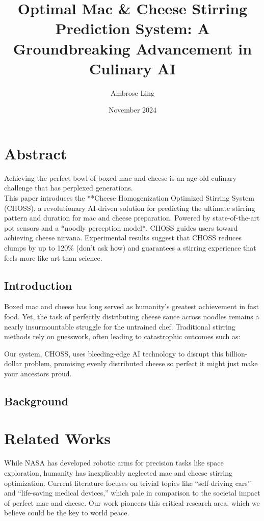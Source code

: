 \documentclass[twocolumn]{article}
\title{Optimal Mac \& Cheese Stirring Prediction System: A Groundbreaking Advancement in Culinary AI}
\author{Ambrose Ling}
\date{November 2024}
\begin{document}
\maketitle

\section{Abstract}
\indent Achieving the perfect bowl of boxed mac and cheese is an age-old culinary challenge that has perplexed generations. \\ \indent This paper introduces the **Cheese Homogenization Optimized Stirring System (CHOSS), a revolutionary AI-driven solution for predicting the ultimate stirring pattern and duration for mac and cheese preparation. Powered by state-of-the-art pot sensors and a *noodly perception model*, CHOSS guides users toward achieving cheese nirvana. Experimental results suggest that CHOSS reduces clumps by up to 120\% (don't ask how) and guarantees a stirring experience that feels more like art than science.

\subsection{Introduction}
Boxed mac and cheese has long served as humanity's greatest achievement in fast food. Yet, the task of perfectly distributing cheese sauce across noodles remains a nearly insurmountable struggle for the untrained chef. Traditional stirring methods rely on guesswork, often leading to catastrophic outcomes such as:



Our system, CHOSS, uses bleeding-edge AI technology to disrupt this billion-dollar problem, promising evenly distributed cheese so perfect it might just make your ancestors proud.
\subsection{Background}

\section{Related Works}
While NASA has developed \cite {ddpm} robotic arms for precision tasks like space exploration, humanity has inexplicably neglected mac and cheese stirring optimization. Current literature focuses on trivial topics like “self-driving cars” and “life-saving medical devices,” which pale in comparison to the societal impact of perfect mac and cheese. Our work pioneers this critical research area, which we believe could be the key to world peace. \cite{transformer}
\end{document}
